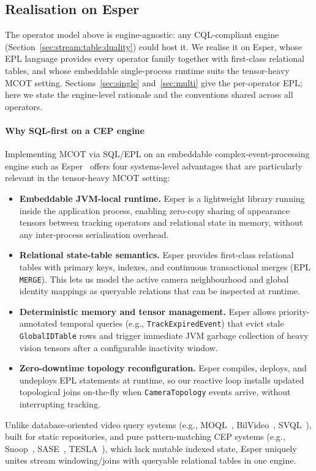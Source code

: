 \documentclass[review]{elsarticle}
\begin{document}
\subsection{Realisation on Esper}
\label{sec:overview:realisation}
The operator model above is engine-agnostic: any CQL-compliant engine (Section~\ref{sec:stream:table:duality}) could host it. We realise it on Esper, whose EPL language provides every operator family together with first-class relational tables, and whose embeddable single-process runtime suits the tensor-heavy MCOT setting. Sections~\ref{sec:single} and~\ref{sec:multi} give the per-operator EPL; here we state the engine-level rationale and the conventions shared across all operators.


\paragraph{Why SQL-first on a CEP engine}
Implementing MCOT via SQL/EPL on an embeddable complex-event-processing engine such as Esper~\cite{espertech2024} offers four systems-level advantages that are particularly relevant in the tensor-heavy MCOT setting:
\begin{itemize}[leftmargin=*]
    \item \textbf{Embeddable JVM-local runtime.} Esper is a lightweight library running inside the application process, enabling zero-copy sharing of appearance tensors between tracking operators and relational state in memory, without any inter-process serialisation overhead.
    \item \textbf{Relational state-table semantics.} Esper provides first-class relational tables with primary keys, indexes, and continuous transactional merges (EPL \texttt{MERGE}). This lets us model the active camera neighbourhood and global identity mappings as queryable relations that can be inspected at runtime.
    \item \textbf{Deterministic memory and tensor management.} Esper allows priority-annotated temporal queries (e.g., \texttt{TrackExpiredEvent}) that evict stale \texttt{GlobalIDTable} rows and trigger immediate JVM garbage collection of heavy vision tensors after a configurable inactivity window.
    \item \textbf{Zero-downtime topology reconfiguration.} Esper compiles, deploys, and undeploys EPL statements at runtime, so our reactive loop installs updated topological joins on-the-fly when \texttt{CameraTopology} events arrive, without interrupting tracking.
\end{itemize}
Unlike database-oriented video query systems (e.g., MOQL~\cite{li1997moql}, BilVideo~\cite{donderler2005bilvideo}, SVQL~\cite{lu2015svql}), built for static repositories, and pure pattern-matching CEP systems (e.g., Snoop~\cite{chakravarthy1994snoop}, SASE~\cite{wu2006sase}, TESLA~\cite{cugola2010tesla}), which lack mutable indexed state, Esper uniquely unites stream windowing/joins with queryable relational tables in one engine.
\end{document}
